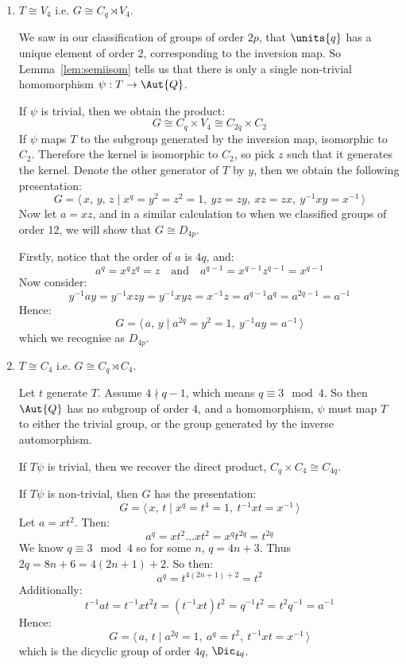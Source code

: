 \begin{enumerate}
    \item \(T \cong V_4\) i.e. \(G \cong C_q \rtimes V_4\).

    We saw in our classification of groups of order \(2p\), that \(\units{q}\) has a unique element of order 2,
    corresponding to the inversion map.
    So Lemma~\ref{lem:semiisom} tells us that there is only a single non-trivial homomorphism \(\psi:T \to \Aut{Q}\).

    If \(\psi\) is trivial, then we obtain the product:
    \[G \cong C_q \times V_4 \cong C_{2q} \times C_2\]
    If \(\psi\) maps \(T\) to the subgroup generated by the inversion map, isomorphic to \(C_2\).
    Therefore the kernel is isomorphic to \(C_2\), so pick \(z\) such that it generates the kernel.
    Denote the other generator of \(T\) by \(y\), then we obtain the following presentation:
    \[G = \langle\, x,\,y,\,z \mid x^q = y^2 = z^2 = 1,\ yz = zy,\ xz = zx,\ y^{-1}xy = x^{-1}\,\rangle\]
    Now let \(a = xz\), and in a similar calculation to when we classified groups of order 12, we will show that \(G
    \cong D_{4p}\).

    Firstly, notice that the order of \(a\) is \(4q\), and:
    \[a^q = x^q z^q = z \quad \text{and} \quad a^{q-1} = x^{q-1} z^{q-1} = x^{q-1}\]
    Now consider:
    \[y^{-1}ay = y^{-1}xzy = y^{-1}xyz = x^{-1}z = a^{q-1} a^q = a^{2q-1} = a^{-1}\]
    Hence:
    \[G = \langle\, a,\,y \mid a^{2q} = y^2 = 1,\ y^{-1}ay = a^{-1}\,\rangle\]
    which we recognise as \(D_{4p}\).

    \item \(T \cong C_4\) i.e. \(G \cong C_q \rtimes C_4\).

        Let \(t\) generate \(T\).
        Assume \(4 \nmid q-1\), which means \(q \equiv 3 \mod{4}\).
        So then \(\Aut{Q}\) has no subgroup of order 4, and a homomorphism, \(\psi\) must map \(T\) to either the
        trivial group, or the group generated by the inverse automorphism.

        If \(T\psi\) is trivial, then we recover the direct product, \(C_q \times C_4 \cong C_{4q}\).

        If \(T\psi\) is non-trivial, then \(G\) has the presentation:
        \[G = \langle\, x,\,t \mid x^q = t^4 = 1,\ t^{-1}xt = x^{-1}\,\rangle\]
        Let \(a = xt^2\).
        Then:
        \[a^q = xt^2\dots xt^2 = x^q t^{2q} = t^{2q}\]
        We know \(q \equiv 3 \mod{4}\) so for some \(n\), \(q = 4n + 3\).
        Thus \(2q = 8n + 6 = 4(2n + 1) + 2\).
        So then:
        \[a^q = t^{4(2n + 1) + 2} = t^2\]
        Additionally:
        \[t^{-1}at = t^{-1}xt^2t = (t^{-1}xt)t^2 = q^{-1}t^2 = t^2 q^{-1} = a^{-1}\]
        Hence:
        \[G = \langle\, a,\,t \mid a^{2q} = 1,\ a^q = t^2,\ t^{-1}xt = x^{-1}\,\rangle\]
        which is the dicyclic group of order \(4q\), \(\Dic_{4q}\).


\end{enumerate}
